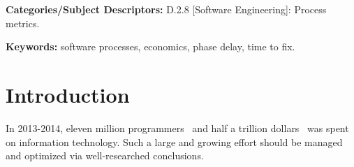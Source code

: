 \documentclass{sig-alternate}
\begin{document}
\vspace{1mm}
\noindent
{\bf Categories/Subject Descriptors:} 
D.2.8 [Software Engineering]: Process metrics.

 

\vspace{1mm}
\noindent
{\bf Keywords:} software processes, economics, phase delay, time to fix.

\section{Introduction}
In 2013-2014, 
eleven  million programmers~\cite{pettey14} and
half a trillion dollars~\cite{avram14} was spent on information technology.
Such a large and growing effort should be managed and optimized via  well-researched conclusions.  
\end{document}
